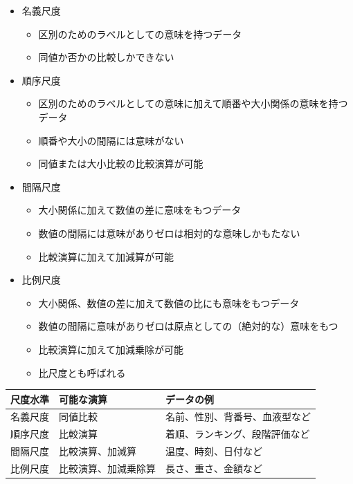 \documentclass[
  12pt,
]{book}
\providecommand{\tightlist}{%
  \setlength{\itemsep}{0pt}\setlength{\parskip}{0pt}}
\begin{document}
\begin{itemize}
\tightlist
\item
  名義尺度

  \begin{itemize}
  \tightlist
  \item
    区別のためのラベルとしての意味を持つデータ
  \item
    同値か否かの比較しかできない
  \end{itemize}
\item
  順序尺度

  \begin{itemize}
  \tightlist
  \item
    区別のためのラベルとしての意味に加えて順番や大小関係の意味を持つデータ
  \item
    順番や大小の間隔には意味がない
  \item
    同値または大小比較の比較演算が可能
  \end{itemize}
\item
  間隔尺度

  \begin{itemize}
  \tightlist
  \item
    大小関係に加えて数値の差に意味をもつデータ
  \item
    数値の間隔には意味がありゼロは相対的な意味しかもたない
  \item
    比較演算に加えて加減算が可能
  \end{itemize}
\item
  比例尺度

  \begin{itemize}
  \tightlist
  \item
    大小関係、数値の差に加えて数値の比にも意味をもつデータ
  \item
    数値の間隔に意味がありゼロは原点としての（絶対的な）意味をもつ
  \item
    比較演算に加えて加減乗除が可能
  \item
    比尺度とも呼ばれる
  \end{itemize}
\end{itemize}

\begin{longtable}[]{@{}lll@{}}
\toprule
尺度水準 & 可能な演算 & データの例 \\
\midrule
\endhead
名義尺度 & 同値比較 & 名前、性別、背番号、血液型など \\
順序尺度 & 比較演算 & 着順、ランキング、段階評価など \\
間隔尺度 & 比較演算、加減算 & 温度、時刻、日付など \\
比例尺度 & 比較演算、加減乗除算 & 長さ、重さ、金額など \\
\bottomrule
\end{longtable}
\end{document}
